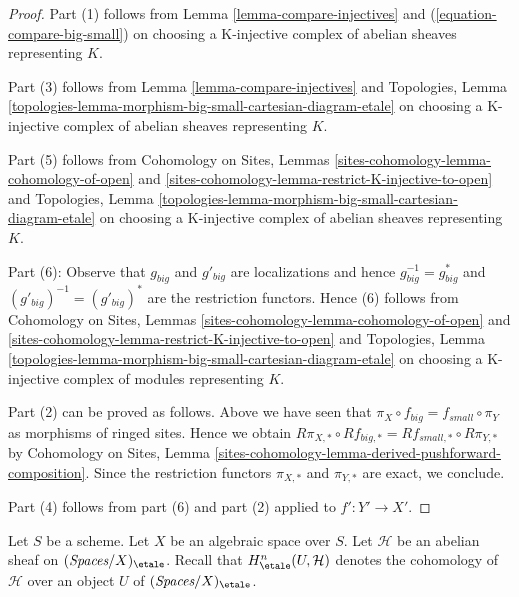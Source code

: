\begin{proof}
Part (1) follows from
Lemma \ref{lemma-compare-injectives}
and (\ref{equation-compare-big-small})
on choosing a K-injective complex of abelian sheaves representing $K$.

\medskip\noindent
Part (3) follows from Lemma \ref{lemma-compare-injectives}
and Topologies, Lemma
\ref{topologies-lemma-morphism-big-small-cartesian-diagram-etale}
on choosing a K-injective complex of abelian sheaves representing $K$.

\medskip\noindent
Part (5) follows from
Cohomology on Sites, Lemmas \ref{sites-cohomology-lemma-cohomology-of-open} and
\ref{sites-cohomology-lemma-restrict-K-injective-to-open}
and Topologies, Lemma
\ref{topologies-lemma-morphism-big-small-cartesian-diagram-etale}
on choosing a K-injective complex of abelian sheaves representing $K$.

\medskip\noindent
Part (6): Observe that $g_{big}$ and $g'_{big}$ are localizations
and hence $g_{big}^{-1} = g_{big}^*$ and $(g'_{big})^{-1} = (g'_{big})^*$
are the restriction functors. Hence (6) follows from
Cohomology on Sites, Lemmas \ref{sites-cohomology-lemma-cohomology-of-open} and
\ref{sites-cohomology-lemma-restrict-K-injective-to-open}
and Topologies, Lemma
\ref{topologies-lemma-morphism-big-small-cartesian-diagram-etale}
on choosing a K-injective complex of modules representing $K$.

\medskip\noindent
Part (2) can be proved as follows. Above we have seen
that $\pi_X \circ f_{big} = f_{small} \circ \pi_Y$ as morphisms
of ringed sites. Hence we obtain
$R\pi_{X, *} \circ Rf_{big, *} = Rf_{small, *} \circ R\pi_{Y, *}$
by Cohomology on Sites, Lemma
\ref{sites-cohomology-lemma-derived-pushforward-composition}.
Since the restriction functors $\pi_{X, *}$ and $\pi_{Y, *}$
are exact, we conclude.

\medskip\noindent
Part (4) follows from part (6) and part (2) applied to $f' : Y' \to X'$.
\end{proof}

\noindent
Let $S$ be a scheme. Let $X$ be an algebraic space over $S$.
Let $\mathcal{H}$ be an abelian sheaf on
$(\textit{Spaces}/X)_\etale$. Recall that $H^n_\etale(U, \mathcal{H})$
denotes the cohomology of $\mathcal{H}$ over an object
$U$ of $(\textit{Spaces}/X)_\etale$.

